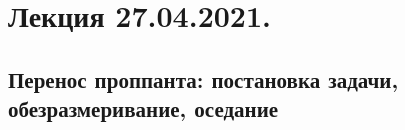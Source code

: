 \documentclass[main.tex]{subfiles}
\begin{document}

\section{Лекция 27.04.2021.}

\subsection{Перенос проппанта: постановка задачи, обезразмеривание, оседание}
\end{document}
